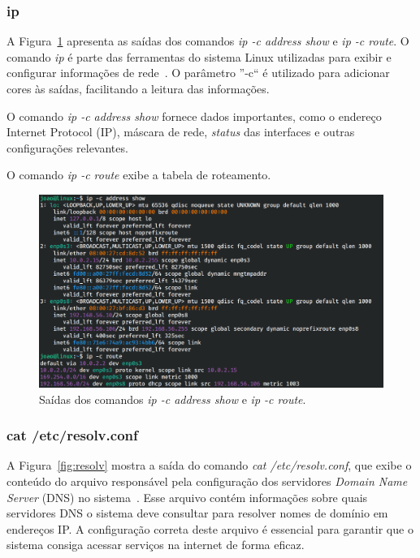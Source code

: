 \documentclass[
	12pt,				%
	oneside,   	        %
	a4paper,			%
	english,			%
	french,				%
	spanish,			%
	brazil,				%
	]{pacotes/abntex2}
\begin{document}
\subsubsection{ip}

A Figura~\ref{fig:ip} apresenta as saídas dos comandos \textit{ip -c address show} e \textit{ip -c route}. O comando \textit{ip} é parte das ferramentas do sistema Linux utilizadas para exibir e configurar informações de rede~\cite{manIP}. O parâmetro ''-c`` é utilizado para adicionar cores às saídas, facilitando a leitura das informações.

O comando \textit{ip -c address show} fornece dados importantes, como o endereço Internet Protocol (IP), máscara de rede, \textit{status} das interfaces e outras configurações relevantes.

O comando \textit{ip -c route} exibe a tabela de roteamento.

\begin{figure}[H]
  \centering
  \includegraphics[scale=0.5]{figuras/ip.png}
  \caption{Saídas dos comandos \textit{ip -c address show} e \textit{ip -c route}.}
  \label{fig:ip}
\end{figure}

\subsubsection{cat /etc/resolv.conf}
A Figura~\ref{fig:resolv} mostra a saída do comando \textit{cat /etc/resolv.conf}, que exibe o conteúdo do arquivo responsável pela configuração dos servidores \textit{Domain Name Server} (DNS) no sistema~\cite{manCat}. Esse arquivo contém informações sobre quais servidores DNS o sistema deve consultar para resolver nomes de domínio em endereços IP. A configuração correta deste arquivo é essencial para garantir que o sistema consiga acessar serviços na internet de forma eficaz. 
\end{document}
